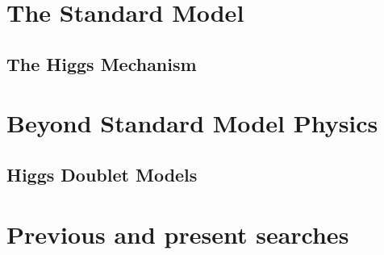 

\section{The Standard Model}
\subsection{The Higgs Mechanism}

\section{Beyond Standard Model Physics}

\subsection{Higgs Doublet Models}

\section{Previous and present searches}
